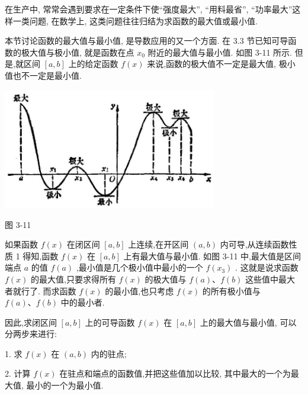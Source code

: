 \documentclass[lang=cn,newtx,12pt,scheme=chinese]{elegantbook}
\begin{document}
在生产中, 常常会遇到要求在一定条件下使“强度最大”, “用料最省”, “功率最大”这样一类问题, 在数学上, 这类问题往往归结为求函数的最大值或最小值.

本节讨论函数的最大值与最小值, 是导数应用的又一个方面. 在 3.3 节已知可导函数的极大值与极小值, 就是函数在点 \({x}_{0}\) 附近的最大值与最小值. 如图 3-11 所示. 但是,就区间 \(\left\lbrack {a,b}\right\rbrack\) 上的给定函数 \(f\left( x\right)\) 来说,函数的极大值不一定是最大值, 极小值也不一定是最小值.

\begin{center}
\includegraphics[max width=0.7\textwidth]{images/01912c18-5c3f-733d-b775-749ba9897a9d_146_522148.jpg}
\end{center}

图 3-11

如果函数 \(f\left( x\right)\) 在闭区间 \(\left\lbrack {a,b}\right\rbrack\) 上连续,在开区间 \(\left( {a,b}\right)\) 内可导,从连续函数性质 1 得知,函数 \(f\left( x\right)\) 在 \(\left\lbrack {a,b}\right\rbrack\) 上有最大值与最小值. 如图 3-11 中,最大值是区间端点 \(a\) 的值 \(f\left( a\right)\) ,最小值是几个极小值中最小的一个 \(f\left( {x}_{3}\right)\) . 这就是说求函数 \(f\left( x\right)\) 的最大值,只要求得所有 \(f\left( x\right)\) 的极大值与 \(f\left( a\right) \text{、}f\left( b\right)\) 这些值中最大者就行了. 而求函数 \(f\left( x\right)\) 的最小值,也只考虑 \(f\left( x\right)\) 的所有极小值与 \(f\left( a\right) \text{、}f\left( b\right)\) 中的最小者.

\begin{proposition}[函数最值求法]

因此,求闭区间 \(\left\lbrack {a,b}\right\rbrack\) 上的可导函数 \(f\left( x\right)\) 在 \(\left\lbrack {a,b}\right\rbrack\) 上的最大值与最小值, 可以分两步来进行:

1. 求 \(f\left( x\right)\) 在 \(\left( {a,b}\right)\) 内的驻点;

2. 计算 \(f\left( x\right)\) 在驻点和端点的函数值,并把这些值加以比较, 其中最大的一个为最大值, 最小的一个为最小值.

\end{proposition}
\end{document}
